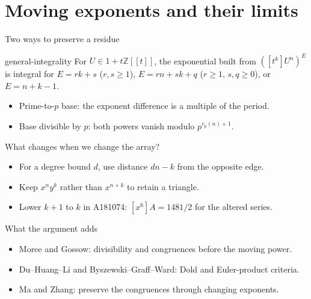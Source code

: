 \documentclass{beamer}
\begin{document}
\section{Moving exponents and their limits}
\begin{frame}{Two ways to preserve a residue}
  \begin{bookresult}{general-integrality}
  For $U\in1+t\mathbb Z[[t]]$, the exponential built from
  $([t^k]U^n)^E$ is integral for $E=rk+s$ ($r,s\ge1$),
  $E=rn+sk+q$ ($r\ge1$, $s,q\ge0$), or $E=n+k-1$.
  \end{bookresult}
  \begin{itemize}
    \item Prime-to-$p$ base: the exponent difference is a multiple of the period.
    \item Base divisible by $p$: both powers vanish modulo $p^{v_p(n)+1}$.
  \end{itemize}
\end{frame}
\begin{frame}{What changes when we change the array?}
  \begin{itemize}
    \item For a degree bound $d$, use distance $dn-k$ from the opposite edge.
    \item Keep $x^ny^k$ rather than $x^{n+k}$ to retain a triangle.
    \item Lower $k+1$ to $k$ in A181074: $[x^6]A=1481/2$ for the altered series.
  \end{itemize}
\end{frame}
\begin{frame}{What the argument adds}
  \begin{itemize}
    \item Moree and Gossow: divisibility and congruences before the moving power.
    \item Du--Huang--Li and Byszewski--Graff--Ward: Dold and Euler-product criteria.
    \item Ma and Zhang: preserve the congruences through changing exponents.
  \end{itemize}
\end{frame}
\appendix
\FormalVerification
\end{document}
